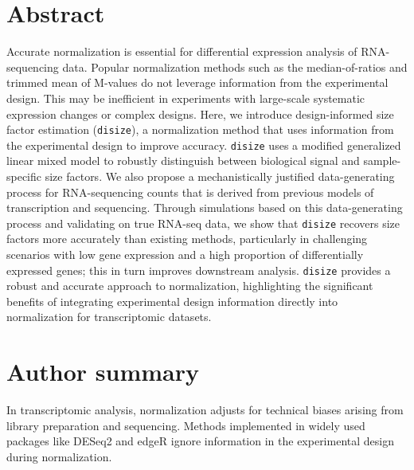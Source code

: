 \documentclass[10pt,letterpaper]{article}
\begin{document}
%
\section*{Abstract}
Accurate normalization is essential for differential expression analysis of RNA-sequencing data. 
Popular normalization methods such as the median-of-ratios and trimmed mean of M-values do not leverage information from the experimental design. 
This may be inefficient in experiments with large-scale systematic expression changes or complex designs.
Here, we introduce design-informed size factor estimation (\texttt{disize}), a normalization method that uses information from the experimental design to improve accuracy. 
\texttt{disize} uses a modified generalized linear mixed model to robustly distinguish between biological signal and sample-specific size factors. 
We also propose a mechanistically justified data-generating process for RNA-sequencing counts that is derived from previous models of transcription and sequencing. 
Through simulations based on this data-generating process and validating on true RNA-seq data, we show that \texttt{disize} recovers size factors more accurately than existing methods, particularly in challenging scenarios with low gene expression and a high proportion of differentially expressed genes; this in turn improves downstream analysis. 
\texttt{disize} provides a robust and accurate approach to normalization, highlighting the significant benefits of integrating experimental design information directly into normalization for transcriptomic datasets.

%
\section*{Author summary}
In transcriptomic analysis, normalization adjusts for technical biases arising from library preparation and sequencing. 
Methods implemented in widely used packages like DESeq2 and edgeR ignore information in the experimental design during normalization.
\end{document}
